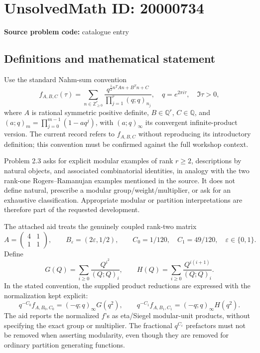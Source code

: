\documentclass[11pt]{article}
\newcommand{\Z}{\mathbb{Z}}
\newcommand{\Q}{\mathbb{Q}}
\begin{document}
\section*{UnsolvedMath ID: 20000734}
\textbf{Source problem code:} catalogue entry
\subsection{Definitions and mathematical statement}
Use the standard Nahm-sum convention
\[
f_{A,B,C}(\tau)=\sum_{n\in\Z_{\geq0}^r}
\frac{q^{\frac12 n^TAn+B^Tn+C}}{\prod_{j=1}^r(q;q)_{n_j}},
\quad q=e^{2\pi i\tau},\quad\Im\tau>0,
\]
where \(A\) is rational symmetric positive definite, \(B\in\Q^r\), \(C\in\Q\), and
\((a;q)_m=\prod_{j=0}^{m-1}(1-aq^j)\), with \((a;q)_\infty\) its convergent infinite-product version. The current record refers to \(f_{A,B,C}\) without reproducing its introductory definition; this convention must be confirmed against the full workshop context.

Problem 2.3 asks for explicit modular examples of rank \(r\geq2\), descriptions by natural objects, and associated combinatorial identities, in analogy with the two rank-one Rogers--Ramanujan examples mentioned in the source. It does not define natural, prescribe a modular group/weight/multiplier, or ask for an exhaustive classification. Appropriate modular or partition interpretations are therefore part of the requested development.

The attached aid treats the genuinely coupled rank-two matrix
\[
A=\begin{pmatrix}4&1\\1&1\end{pmatrix},\qquad
B_\varepsilon=(2\varepsilon,1/2),\qquad
C_0=1/120,\quad C_1=49/120,\quad\varepsilon\in\{0,1\}.
\]
Define
\[
G(Q)=\sum_{i\geq0}\frac{Q^{i^2}}{(Q;Q)_i},\qquad
H(Q)=\sum_{i\geq0}\frac{Q^{i(i+1)}}{(Q;Q)_i}.
\]
In the stated convention, the supplied product reductions are expressed with the normalization kept explicit:
\[
q^{-C_0}f_{A,B_0,C_0}=(-q;q)_\infty G(q^2),\qquad
q^{-C_1}f_{A,B_1,C_1}=(-q;q)_\infty H(q^2).
\]
The aid reports the normalized \(f\)'s as eta/Siegel modular-unit products, without specifying the exact group or multiplier. The fractional \(q^{C_\varepsilon}\) prefactors must not be removed when asserting modularity, even though they are removed for ordinary partition generating functions.
\end{document}
